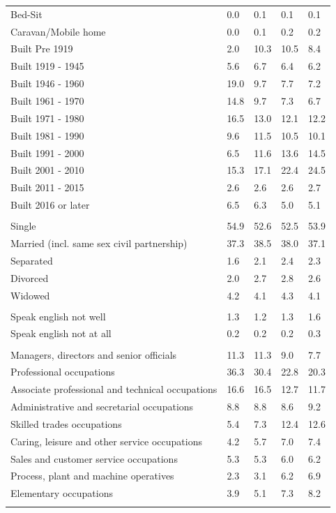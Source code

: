 \documentclass{article}
\begin{document}
\begin{table}[h]
\begin{tabular}{KTTTT}
Bed-Sit & 0.0& 0.1& 0.1& 0.1\\
Caravan/Mobile home & 0.0& 0.1& 0.2& 0.2\\
    \hline
Built Pre 1919 &  2.0& 10.3& 10.5&  8.4\\
Built 1919 - 1945 & 5.6& 6.7& 6.4& 6.2\\
Built  1946 - 1960 & 19.0&  9.7&  7.7&  7.2\\
Built  1961 - 1970 & 14.8&  9.7&  7.3&  6.7\\
Built  1971 - 1980 & 16.5& 13.0& 12.1& 12.2\\
Built  1981 - 1990 &  9.6& 11.5& 10.5& 10.1\\
Built  1991 - 2000 &  6.5& 11.6& 13.6& 14.5\\
Built  2001 - 2010 & 15.3& 17.1& 22.4& 24.5\\
Built  2011 - 2015 & 2.6& 2.6& 2.6& 2.7\\
Built  2016 or later & 6.5& 6.3& 5.0& 5.1\\
\hline
    \\
    \hline
Single & 54.9& 52.6& 52.5& 53.9\\
Married (incl. same sex civil partnership) & 37.3& 38.5& 38.0& 37.1\\
Separated  & 1.6& 2.1& 2.4& 2.3\\
Divorced  & 2.0& 2.7& 2.8& 2.6\\
Widowed & 4.2& 4.1& 4.3& 4.1\\
\hline
    \\ 
    \hline
Speak english not well & 1.3& 1.2& 1.3& 1.6\\
Speak english not at all & 0.2& 0.2& 0.2& 0.3\\
\hline
    \\
    \hline
Managers, directors and senior officials & 11.3& 11.3&  9.0&  7.7\\
Professional occupations & 36.3& 30.4& 22.8& 20.3\\
Associate professional and technical occupations & 16.6& 16.5& 12.7& 11.7\\
Administrative and secretarial occupations & 8.8& 8.8& 8.6& 9.2\\
Skilled trades occupations &  5.4&  7.3& 12.4& 12.6\\
Caring, leisure and other service occupations & 4.2& 5.7& 7.0& 7.4\\
Sales and customer service occupations & 5.3& 5.3& 6.0& 6.2\\
Process, plant and machine operatives & 2.3& 3.1& 6.2& 6.9\\
Elementary occupations & 3.9& 5.1& 7.3& 8.2\\
\hline
\end{tabular}
\end{table}
\end{document}
